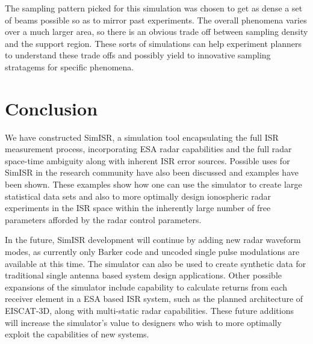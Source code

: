 \documentclass[draft,ras]{agutex}
\begin{document}
\begin{article}
The sampling pattern picked for this simulation was chosen to get as dense a set of beams possible so as to mirror past experiments. 
The overall phenomena varies over a much larger area, so there is an obvious trade off between sampling density and the support region. These sorts of simulations can help experiment planners to understand these trade offs and possibly yield to innovative sampling stratagems for specific phenomena. 
\section{Conclusion}
We have constructed SimISR, a simulation tool encapsulating the full ISR measurement process, incorporating ESA radar capabilities and the full radar space-time ambiguity along with inherent ISR error sources. Possible uses for SimISR in the research community have also been discussed and examples have been shown. These examples show how one can use the simulator to create large statistical data sets and also to more optimally design ionospheric radar experiments in the ISR space within the inherently large number of free parameters afforded by the radar control parameters. 

In the future, SimISR development will continue by adding new radar waveform modes, as currently only Barker code and uncoded single pulse modulations are available at this time. The simulator can also be used to create synthetic data for traditional single antenna based system design applications. Other possible expansions of the simulator include capability to calculate returns from each receiver element in a ESA based ISR system, such as the planned architecture of EISCAT-3D, along with multi-static radar capabilities. These future additions will increase the simulator's value to designers who wish to more optimally exploit the capabilities of new systems. 


\end{article}
\end{document}
